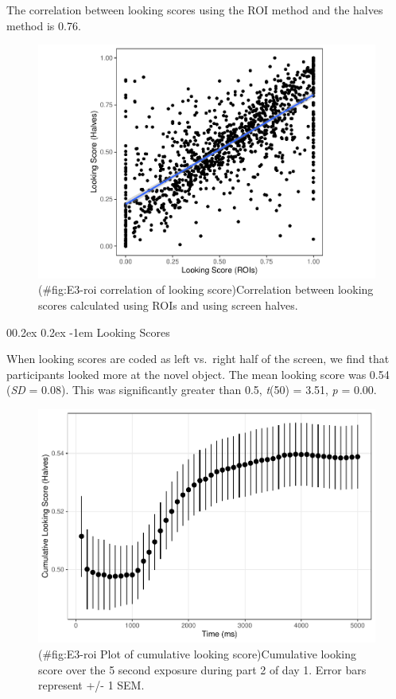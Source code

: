 \documentclass[
  man,floatsintext]{apa6}
\makeatletter
\let\oldparagraph\paragraph
\renewcommand{\paragraph}[1]{\oldparagraph{#1}\mbox{}}
\renewcommand{\paragraph}{\@startsection{paragraph}{4}{\parindent}%
  {0\baselineskip \@plus 0.2ex \@minus 0.2ex}%
  {-1em}%
  {\normalfont\normalsize\bfseries\itshape\typesectitle}}
\makeatother
\begin{document}
The correlation between looking scores using the ROI method and the halves method is 0.76.

\begin{figure}
\centering
\includegraphics{manuscript_files/figure-latex/E3-roi correlation of looking score-1.pdf}
\caption{(\#fig:E3-roi correlation of looking score)Correlation between looking scores calculated using ROIs and using screen halves.}
\end{figure}

\hypertarget{looking-scores}{%
\paragraph{Looking Scores}\label{looking-scores}}

When looking scores are coded as left vs.~right half of the screen, we find that participants looked more at the novel object. The mean looking score was 0.54 (\emph{SD} = 0.08). This was significantly greater than 0.5, \emph{t}(50) = 3.51, \emph{p} = 0.00.

\begin{figure}
\centering
\includegraphics{manuscript_files/figure-latex/E3-roi Plot of cumulative looking score-1.pdf}
\caption{(\#fig:E3-roi Plot of cumulative looking score)Cumulative looking score over the 5 second exposure during part 2 of day 1. Error bars represent +/- 1 SEM.}
\end{figure}
\end{document}
